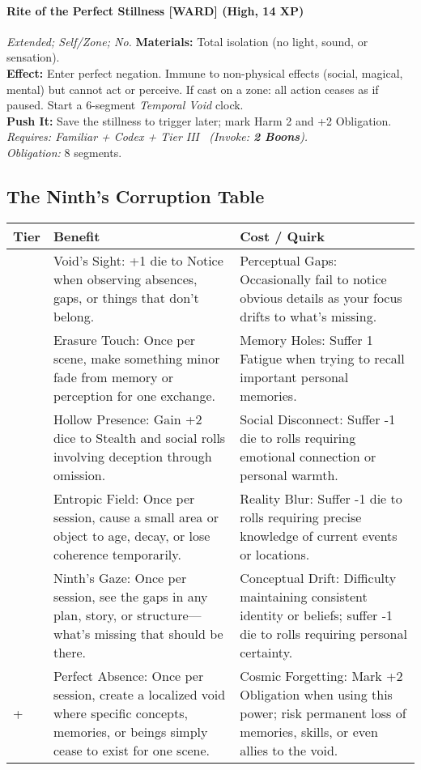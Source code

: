 \paragraph{Rite of the Perfect Stillness \textnormal{[WARD]} (High, 14 XP)} \emph{Extended; Self/Zone; No.}
\textbf{Materials:} Total isolation (no light, sound, or sensation).\\
\textbf{Effect:} Enter perfect negation. Immune to non-physical effects (social, magical, mental) but cannot act or perceive. If cast on a zone: all action ceases as if paused. Start a 6-segment \emph{Temporal Void} clock.\\
\textbf{Push It:} Save the stillness to trigger later; mark Harm 2 and +2 Obligation.\\
\emph{Requires: Familiar + Codex + Tier III \ (\textit{Invoke:} \textbf{2 Boons}).}\\
\emph{Obligation:} 8 segments.

\subsection*{The Ninth's Corruption Table}
\label{sec:ninth-corruption}

\begin{longtable}{>{\raggedright\arraybackslash}p{1cm} p{5cm} p{5cm}}
\toprule
\textbf{Tier} & \textbf{Benefit} & \textbf{Cost / Quirk} \\
\midrule
1 & Void's Sight: +1 die to Notice when observing absences, gaps, or things that don't belong. & Perceptual Gaps: Occasionally fail to notice obvious details as your focus drifts to what's missing. \\
\midrule
2 & Erasure Touch: Once per scene, make something minor fade from memory or perception for one exchange. & Memory Holes: Suffer 1 Fatigue when trying to recall important personal memories. \\
\midrule
3 & Hollow Presence: Gain +2 dice to Stealth and social rolls involving deception through omission. & Social Disconnect: Suffer -1 die to rolls requiring emotional connection or personal warmth. \\
\midrule
4 & Entropic Field: Once per session, cause a small area or object to age, decay, or lose coherence temporarily. & Reality Blur: Suffer -1 die to rolls requiring precise knowledge of current events or locations. \\
\midrule
5 & Ninth's Gaze: Once per session, see the gaps in any plan, story, or structure—what's missing that should be there. & Conceptual Drift: Difficulty maintaining consistent identity or beliefs; suffer -1 die to rolls requiring personal certainty. \\
\midrule
6+ & Perfect Absence: Once per session, create a localized void where specific concepts, memories, or beings simply cease to exist for one scene. & Cosmic Forgetting: Mark +2 Obligation when using this power; risk permanent loss of memories, skills, or even allies to the void. \\
\bottomrule
\end{longtable}